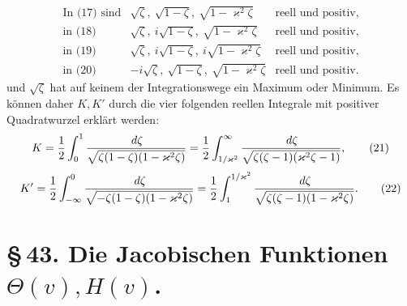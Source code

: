 \documentclass[11pt]{article}
\providecommand{\dd}{\,d}
\begin{document}
\[
\begin{array}{rcl}
\text{In (17) sind} & \sqrt\zeta,\ \sqrt{1-\zeta},\ \sqrt{1-\varkappa^2\zeta} & \text{reell und positiv},\\
\text{in (18) } & \sqrt\zeta,\ i\sqrt{1-\zeta},\ \sqrt{1-\varkappa^2\zeta} & \text{reell und positiv},\\
\text{in (19) } & \sqrt\zeta,\ i\sqrt{1-\zeta},\ i\sqrt{1-\varkappa^2\zeta} & \text{reell und positiv},\\
\text{in (20) } & -i\sqrt\zeta,\ \sqrt{1-\zeta},\ \sqrt{1-\varkappa^2\zeta} & \text{reell und positiv}.
\end{array}
\]
und $\sqrt\zeta$ hat auf keinem der Integrationswege ein Maximum oder Minimum. Es können daher $K,K'$ durch die vier folgenden reellen Integrale mit positiver Quadratwurzel erklärt werden:
\begin{equation}
K={1\over2}\int_0^1 {\dd\zeta\over\sqrt{\zeta(1-\zeta)(1-\varkappa^2\zeta)}}
={1\over2}\int_{1/\varkappa^2}^{\infty}{\dd\zeta\over\sqrt{\zeta(\zeta-1)(\varkappa^2\zeta-1)}},
\tag{21}
\end{equation}
\begin{equation}
K'={1\over2}\int_{-\infty}^{0}{\dd\zeta\over\sqrt{-\zeta(1-\zeta)(1-\varkappa^2\zeta)}}
={1\over2}\int_1^{1/\varkappa^2}{\dd\zeta\over\sqrt{\zeta(\zeta-1)(1-\varkappa^2\zeta)}}.
\tag{22}
\end{equation}

\section*{\S\,43. Die Jacobischen Funktionen $\Theta(v),H(v)$.}
\end{document}
